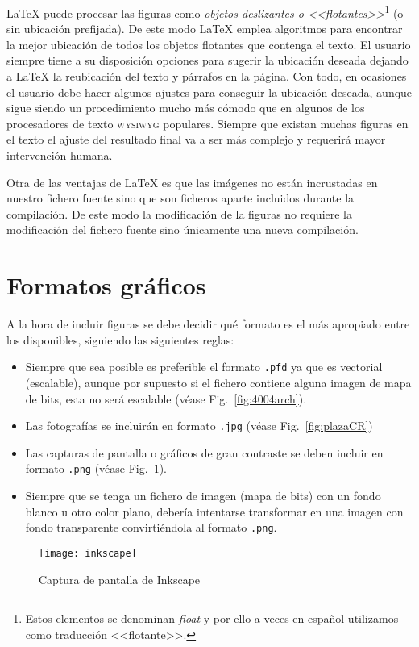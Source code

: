\documentclass[11pt,a4paper]{article}
\begin{document}
\LaTeX{} puede procesar las figuras como \emph{objetos deslizantes o <<flotantes>>}\footnote{Estos elementos se denominan \textit{float} y por ello a veces en español utilizamos como traducción <<flotante>>.} (o sin ubicación prefijada). De este modo \LaTeX{} emplea algoritmos para encontrar la mejor ubicación de todos los objetos flotantes que contenga el texto. El usuario siempre tiene a su disposición opciones para sugerir la ubicación deseada dejando a \LaTeX{} la reubicación del texto y párrafos en la página. Con todo, en ocasiones el usuario debe hacer algunos ajustes para conseguir la ubicación deseada, aunque sigue siendo un procedimiento mucho más cómodo que en algunos de los procesadores de texto \textsc{wysiwyg} populares. Siempre que existan muchas figuras en el texto el ajuste del resultado final va a ser más complejo y requerirá mayor intervención humana.


Otra de las ventajas de \LaTeX{} es que las imágenes no están incrustadas en nuestro fichero fuente sino que son ficheros aparte incluidos durante la compilación. De este modo la modificación de la figuras no requiere la modificación del fichero fuente sino únicamente una nueva compilación.


\section{Formatos gráficos}
A la hora de incluir figuras se debe decidir qué formato es el más apropiado entre los disponibles, siguiendo las siguientes reglas:
\begin{itemize}
	\item Siempre que sea posible es preferible el formato \texttt{.pfd} ya que es vectorial (escalable), aunque por supuesto si el fichero contiene alguna imagen de mapa de bits, esta no será escalable (véase Fig.~\ref{fig:4004arch}).
	\item Las fotografías se incluirán en formato \texttt{.jpg} (véase Fig.~\ref{fig:plazaCR})
	\item Las capturas de pantalla o gráficos de gran contraste se deben incluir en formato \texttt{.png} (véase Fig.~\ref{fig:inkscape}). 
	\item Siempre que se tenga un fichero de imagen (mapa de bits) con un fondo blanco u otro color plano, debería intentarse transformar en una imagen con fondo transparente convirtiéndola al formato \texttt{.png}.
\end{itemize}


\begin{figure}[ht]
	\centering
	\texttt{[image: inkscape]} 
	\caption[Ejemplo de captura en png]{Captura de pantalla de \textsf{Inkscape}}
	\label{fig:inkscape}
\end{figure}
\end{document}

